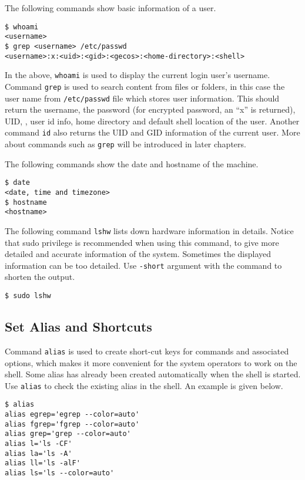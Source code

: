 {The following commands show basic information of a user.
\begin{lstlisting}
$ whoami
<username>
$ grep <username> /etc/passwd
<username>:x:<uid>:<gid>:<gecos>:<home-directory>:<shell>
\end{lstlisting}
In the above, \verb|whoami| is used to display the current login user's username. Command \verb|grep| is used to search content from files or folders, in this case the user name from \verb|/etc/passwd| file which stores user information. This should return the username, the password (for encrypted password, an ``x'' is returned), UID, , user id info, home directory and default shell location of the user.
Another command \verb|id| also returns the UID and GID information of the current user. More about commands such as \verb|grep| will be introduced in later chapters.

The following commands show the date and hostname of the machine.
\begin{lstlisting}
$ date
<date, time and timezone>
$ hostname
<hostname>
\end{lstlisting}

The following command \verb|lshw| lists down hardware information in details. Notice that sudo privilege is recommended when using this command, to give more detailed and accurate information of the system. Sometimes the displayed information can be too detailed. Use \verb|-short| argument with the command to shorten the output.
\begin{lstlisting}
$ sudo lshw
\end{lstlisting}

\subsection{Set Alias and Shortcuts}

Command \verb|alias| is used to create short-cut keys for commands and associated options, which makes it more convenient for the system operators to work on the shell. Some alias has already been created automatically when the shell is started. Use \verb|alias| to check the existing alias in the shell. An example is given below.

\begin{lstlisting}
$ alias
alias egrep='egrep --color=auto'
alias fgrep='fgrep --color=auto'
alias grep='grep --color=auto'
alias l='ls -CF'
alias la='ls -A'
alias ll='ls -alF'
alias ls='ls --color=auto'
\end{lstlisting}

}
